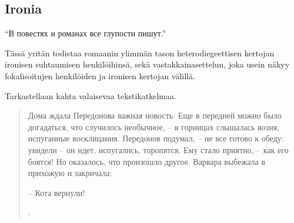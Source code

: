 \documentclass[12pt,a4paper]{article}
\begin{document}
\begin{comment}
Jerofejevin tekemä huomio monikasvoisesta \enquote{многолик} kertojasta on kuitenkin asiaankuuluva, ja tätä aspektia ei Mintsin artikkelissa oteta huomioon. Uusmytologisen tekstin myyttien keskinäinen dikotomia ei voi olla näkymättä myös romaanin kerronnassa ja narrotologisessa rakenteessa. 

\section{Мелкий бес}

В этом главе рассматрываем основный и самый популярный роман Федора Сологуба <<Мелкий бес>> (закончен в 1902, впервые опубликован в 1905) с точки зрения нарратологий. Разные исследователи характеризировали сюжет романа либо как антисюжет -- очень симплистическая истрория в котором почти ничего не произходит, либо как максимально  
''Внешнего действия в «Мелком бесе» мало. Постепенно сходит с ума его главный герой, учитель гимназии Передонов, умственно ограниченный, угрюмый и недоброжелательный человек.''
\autocite[432.]{grigorjev1983}
\end{comment}

\subsection{Ironia}

\enquote{В повестях и романах все глупости пишут.}\parencite[54]{sologub2004}



Tässä yritän todistaa romaanin ylimmän tason heterodiegeettisen kertojan ironisen suhtaumisen henkilöihinsä, sekä vastakkainasettelun, joka usein näkyy fokalisoitujen henkilöiden ja ironisen kertojan välillä.

Tarkastellaan kahta valaisevaa tekstikatkelmaa.

\begin{quote}
Дома ждала Передонова важная новость. Еще в передней можно
было догадаться, что случилось необычное, – в горницах слышалась 
возня, испуганные восклицания. Передонов подумал, – не все
готово к обеду: увидели – он идет, испугались, торопятся. Ему стало
приятно, – как его боятся! Но оказалось, что произошло другое. 
Варвара выбежала в прихожую и закричала:

– Кота вернули!

\parencite[171]{sologub2004}.

\end{quote}
\end{document}
